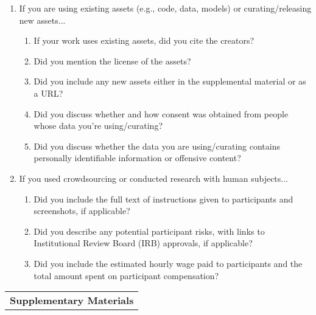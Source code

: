 \documentclass{article}
\begin{document}
\begin{enumerate}
\item If you are using existing assets (e.g., code, data, models) or curating/releasing new assets...
\begin{enumerate}
  \item If your work uses existing assets, did you cite the creators?
       \answerYes{}
  \item Did you mention the license of the assets?
  \item Did you include any new assets either in the supplemental material or as a URL?
  \item Did you discuss whether and how consent was obtained from people whose data you're using/curating?
  \item Did you discuss whether the data you are using/curating contains personally identifiable information or offensive content?
\end{enumerate}


\item If you used crowdsourcing or conducted research with human subjects...
\begin{enumerate}
  \item Did you include the full text of instructions given to participants and screenshots, if applicable?
   \answerNA{}
  \item Did you describe any potential participant risks, with links to Institutional Review Board (IRB) approvals, if applicable?
   \answerNA{}
  \item Did you include the estimated hourly wage paid to participants and the total amount spent on participant compensation?
   \answerNA{}
\end{enumerate}


\end{enumerate}

 

\clearpage


\appendix 

\begin{table}
	\setlength{\tabcolsep}{0.2cm}
	\begin{tabular}{p{}}
		\nipstophline 
		\vspace{-2pt}
		\centering
		\textbf{\Large{Supplementary Materials}}
		\vspace{-5pt}
		\nipsbottomhline   
	\end{tabular}
\end{table}\vspace{-5pt}
 
\end{document}
